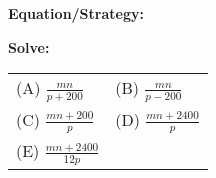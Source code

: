 \begin{multicols*}{2}
\begin{outline}[enumerate]
\bigskip
\textbf{Equation/Strategy:} \hrulefill

\bigskip
\textbf{Solve:}

\vfill
\begin{spacing}{2.75}
\begin{tabularx}{0.4\textwidth}{*2{@{}X}}
(A) $\frac{mn}{p+200}$ & (B) $\frac{mn}{p-200}$\\
(C) $\frac{mn+200}{p}$ & (D) $\frac{mn+2400}{p}$\\
(E) $\frac{mn+2400}{12p}$
\end{tabularx}
\pagebreak
\end{spacing}
\end{outline}
\end{multicols*}